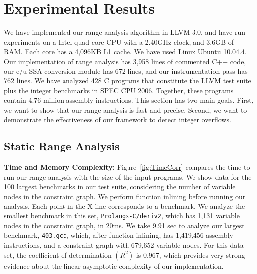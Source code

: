 \documentclass{sigplanconf}[10pt]
\begin{document}
\section{Experimental Results}
\label{sec:exp}

We have implemented our range analysis algorithm in LLVM 3.0, and have run
experiments on a Intel quad core CPU with a 2.40GHz clock, and 3.6GB of RAM.
Each core has a 4,096KB L1 cache.
We have used Linux Ubuntu 10.04.4.
Our implementation of range analysis has 3,958 lines of
commented C++ code, our e/u-SSA conversion module has 672 lines, and our
instrumentation pass has 762 lines.
We have analyzed 428 C programs that constitute the LLVM test suite plus the
integer benchmarks in SPEC CPU 2006.
Together, these programs contain 4.76 million assembly instructions.
This section has two main goals.
First, we want to show that our range analysis is fast and precise.
Second, we want to demonstrate the effectiveness of our framework to detect
integer overflows.

\subsection{Static Range Analysis}
\label{sub:range}

\noindent
\textbf{Time and Memory Complexity: }
Figure~\ref{fig:TimeCorr} compares the time to run our range analysis with the size of
the input programs.
We show data for the 100 largest benchmarks in our test suite, considering the number
of variable nodes in the constraint graph.
We perform function inlining before running our analysis.
Each point in the X line corresponds to a benchmark.
We analyze the smallest benchmark in this set, \texttt{Prolangs-C/deriv2}, which
has 1,131 variable nodes in the constraint graph, in 20ms.
We take 9.91 sec to analyze our largest benchmark, \texttt{403.gcc}, which,
after function inlining, has 1,419,456 assembly instructions, and a
constraint graph with 679,652 variable nodes.
For this data set, the coefficient of determination $(R^2)$ is 0.967, which
provides very strong evidence about the linear asymptotic complexity of our
implementation.
\end{document}

